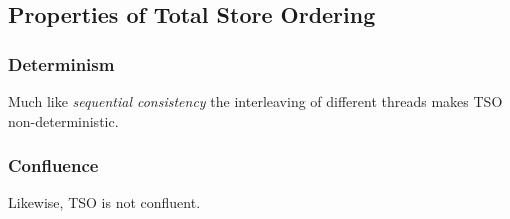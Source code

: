\subsection{Properties of Total Store Ordering}
\subsubsection{Determinism}
Much like \textit{sequential consistency} the interleaving of different threads makes TSO non-deterministic.

\subsubsection{Confluence}
Likewise, TSO is not confluent.